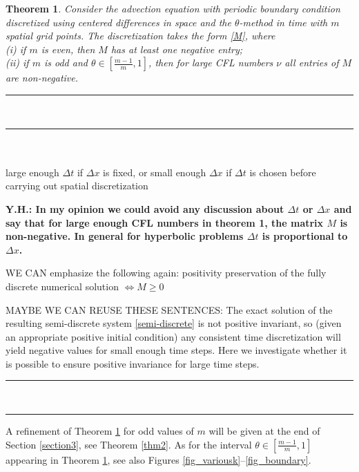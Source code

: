 \documentclass[a4paper]{article}
\newtheorem{theorem}{Theorem}
\newcommand{\dt}{\Delta t}
\newcommand{\dx}{\Delta x}
\begin{document}
\begin{theorem}\label{thm1}
Consider the advection equation with periodic boundary condition discretized using centered
differences in space and the $\theta$-method in time with $m$ spatial grid points.  
The discretization takes the form \eqref{M},
where\\
(i) if $m$ is even, then $M$ has at least one negative entry;\\
(ii) if $m$ is odd and $\theta\in\left[\frac{m-1}{m},1\right]$, then for large CFL numbers $\nu$ all
entries of $M$ are non-negative.
\end{theorem}

\noindent\rule{10cm}{0.4pt}\\
\noindent\rule{10cm}{0.4pt}\\
\\
large enough $\dt$ if $\dx$ is fixed, or small enough $\dx$ if $\dt$ is chosen before carrying out spatial discretization

\textbf{Y.H.: In my opinion we could avoid any discussion about $\dt$ or $\dx$ and say that for large
enough CFL numbers in theorem 1, the matrix $M$ is non-negative.
In general for hyperbolic problems $\dt$ is proportional to  $\dx$.}

WE CAN emphasize the following again: positivity preservation of the fully discrete numerical solution  
$\Longleftrightarrow  M\ge 0$

MAYBE WE CAN REUSE THESE SENTENCES:
The exact solution of the resulting semi-discrete
system \eqref{semi-discrete} is not positive invariant, so (given an appropriate
positive initial condition) any consistent time discretization will yield
negative values for small enough time steps.  Here we investigate whether
it is possible to ensure positive invariance for large time steps.\\
\noindent\rule{10cm}{0.4pt}\\
\noindent\rule{10cm}{0.4pt}

A refinement of Theorem \ref{thm1} for odd values of $m$ will be given at the end of Section \ref{section3}, see Theorem \ref{thm2}.
As for the interval $\theta\in\left[\frac{m-1}{m},1\right]$ appearing in Theorem \ref{thm1}, see also 
Figures \ref{fig_variousk}--\ref{fig_boundary}.
\end{document}
